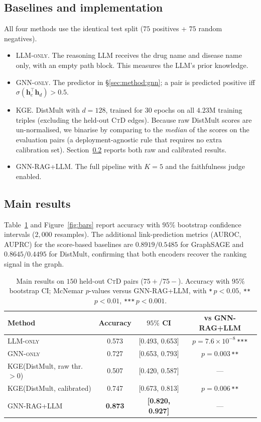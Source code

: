\documentclass{article}
\newcommand{\ours}{\textsc{GNN-RAG+LLM}\xspace}
\newcommand{\gnno}{\textsc{GNN-only}\xspace}
\newcommand{\llmo}{\textsc{LLM-only}\xspace}
\newcommand{\kge}{\textsc{KGE}\xspace}
\newcommand{\ctd}{\textsc{CtD}\xspace}
\begin{document}
\subsection{Baselines and implementation}
All four methods use the identical test split ($75$ positives + $75$ random negatives).
\begin{itemize}
    \item \llmo. The reasoning LLM receives the drug name and disease name only, with an empty path block. This measures the LLM's prior knowledge.
    \item \gnno. The predictor in \S\ref{sec:method:gnn}; a pair is predicted positive iff $\sigma(\mathbf{h}_c^{\top}\mathbf{h}_d)>0.5$.
    \item \kge. DistMult with $d{=}128$, trained for $30$ epochs on all $4.23\mathrm{M}$ training triples (excluding the held-out \ctd edges). Because raw DistMult scores are un-normalised, we binarise by comparing to the \emph{median} of the scores on the evaluation pairs (a deployment-agnostic rule that requires no extra calibration set). Section~\ref{sec:exp:main} reports both raw and calibrated results.
    \item \ours. The full pipeline with $K{=}5$ and the faithfulness judge enabled.
\end{itemize}

\subsection{Main results}
\label{sec:exp:main}

Table~\ref{tab:main} and Figure~\ref{fig:bars} report accuracy with $95\%$ bootstrap confidence intervals ($2{,}000$ resamples). The additional link-prediction metrics (AUROC, AUPRC) for the score-based baselines are $0.8919/0.5485$ for GraphSAGE and $0.8645/0.4495$ for DistMult, confirming that both encoders recover the ranking signal in the graph.

\begin{table}[t]
\centering
\small
\caption{Main results on $150$ held-out \ctd pairs ($75{+}/75{-}$). Accuracy with $95\%$ bootstrap CI; McNemar $p$-values versus \ours, with \texttt{*}\,$p{<}0.05$, \texttt{**}\,$p{<}0.01$, \texttt{***}\,$p{<}0.001$.}
\label{tab:main}
\begin{tabular}{@{}lccc@{}}
\toprule
Method & Accuracy & $95\%$ CI & vs \ours \\
\midrule
\llmo                           & 0.573 & [0.493, 0.653] & $p{=}7.6{\times}10^{-8}$\,\texttt{***} \\
\gnno                           & 0.727 & [0.653, 0.793] & $p{=}0.003$\,\texttt{**} \\
\kge (DistMult, raw thr.\ $>0$) & 0.507 & [0.420, 0.587] & --- \\
\kge (DistMult, calibrated)     & 0.747 & [0.673, 0.813] & $p{=}0.006$\,\texttt{**} \\
\rowcolor{accent!8}\ours        & \textbf{0.873} & \textbf{[0.820, 0.927]} & --- \\
\bottomrule
\end{tabular}
\end{table}
\end{document}
